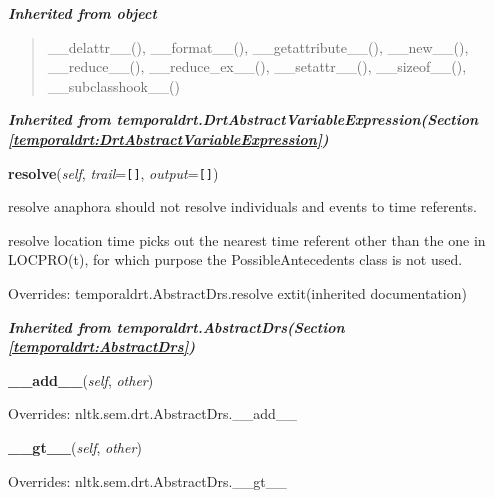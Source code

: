 \large{\textbf{\textit{Inherited from object}}}

\begin{quote}
\_\_delattr\_\_(), \_\_format\_\_(), \_\_getattribute\_\_(), \_\_new\_\_(), \_\_reduce\_\_(), \_\_reduce\_ex\_\_(), \_\_setattr\_\_(), \_\_sizeof\_\_(), \_\_subclasshook\_\_()
\end{quote}

\large{\textbf{\textit{Inherited from temporaldrt.DrtAbstractVariableExpression\textit{(Section \ref{temporaldrt:DrtAbstractVariableExpression})}}}}

    \vspace{0.5ex}

\hspace{.8\funcindent}\begin{boxedminipage}{\funcwidth}

    \raggedright \textbf{resolve}(\textit{self}, \textit{trail}={\tt \texttt{[}\texttt{]}}, \textit{output}={\tt \texttt{[}\texttt{]}})

\setlength{\parskip}{2ex}
    resolve anaphora should not resolve individuals and events to time 
    referents.

    resolve location time picks out the nearest time referent other than 
    the one in LOCPRO(t), for which purpose the PossibleAntecedents class 
    is not used.

\setlength{\parskip}{1ex}
      Overrides: temporaldrt.AbstractDrs.resolve 	extit{(inherited documentation)}

    \end{boxedminipage}


\large{\textbf{\textit{Inherited from temporaldrt.AbstractDrs\textit{(Section \ref{temporaldrt:AbstractDrs})}}}}

    \vspace{0.5ex}

\hspace{.8\funcindent}\begin{boxedminipage}{\funcwidth}

    \raggedright \textbf{\_\_add\_\_}(\textit{self}, \textit{other})

\setlength{\parskip}{2ex}
\setlength{\parskip}{1ex}
      Overrides: nltk.sem.drt.AbstractDrs.\_\_add\_\_

    \end{boxedminipage}

    \vspace{0.5ex}

\hspace{.8\funcindent}\begin{boxedminipage}{\funcwidth}

    \raggedright \textbf{\_\_gt\_\_}(\textit{self}, \textit{other})

\setlength{\parskip}{2ex}
\setlength{\parskip}{1ex}
      Overrides: nltk.sem.drt.AbstractDrs.\_\_gt\_\_

    \end{boxedminipage}

